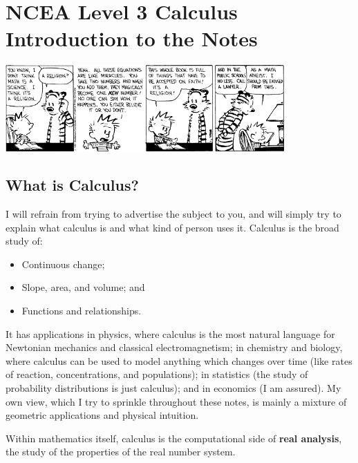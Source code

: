 


\section*{NCEA Level 3 Calculus\\Introduction to the Notes}

\begin{center}
  \includegraphics[width=0.8\textwidth]{hobbes}
\end{center}

\subsection* {What is Calculus?}
I will refrain from trying to advertise the subject to you, and will simply try to explain what calculus is and what kind of
person uses it. Calculus is the broad study of:
\begin{itemize}
  \item Continuous change;
  \item Slope, area, and volume; and
  \item Functions and relationships.
\end{itemize}

It has applications in physics, where calculus is the most natural language for Newtonian mechanics and classical electromagnetism; in chemistry
and biology, where calculus can be used to model anything which changes over time (like rates of reaction, concentrations, and populations); in
statistics (the study of probability distributions is just calculus); and in economics (I am assured). My own view, which I try to sprinkle throughout
these notes, is mainly a mixture of geometric applications and physical intuition.

Within mathematics itself, calculus is the computational side of \textbf{real analysis}, the study of the properties of the real number system.

